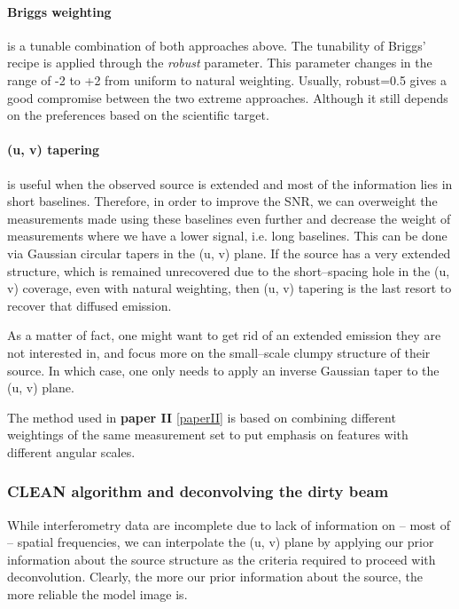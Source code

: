 \documentclass[paper=a4, fontsize=11pt]{scrartcl} %
\numberwithin{equation}{section} %
\numberwithin{figure}{section} %
\numberwithin{table}{section} %
\begin{document}
\paragraph*{Briggs weighting} is a tunable combination of both approaches above. The tunability of Briggs' recipe is applied through the \emph{robust} parameter. This parameter changes in the range of -2 to +2 from uniform to natural weighting. Usually, robust=0.5 gives a good compromise between the two extreme approaches. Although it still depends on the preferences based on the scientific target.

\paragraph*{(u, v) tapering} is useful when the observed source is extended and most of the information lies in short baselines. Therefore, in order to improve the SNR, we can overweight the measurements made using these baselines even further and decrease the weight of measurements where we have a lower signal, i.e. long baselines. This can be done via Gaussian circular tapers in the (u, v) plane. If the source has a very extended structure, which is remained unrecovered due to the short--spacing hole in the (u, v) coverage, even with natural weighting, then (u, v) tapering is the last resort to recover that diffused emission. 

As a matter of fact, one might want to get rid of an extended emission they are not interested in, and focus more on the small--scale clumpy structure of their source. In which case, one only needs to apply an inverse Gaussian taper to the (u, v) plane.

The method used in {\bf paper II} \ref{paperII} is based on combining different weightings of the same measurement set to put emphasis on features with different angular scales. 
\subsubsection*{CLEAN algorithm and deconvolving the dirty beam}
\label{sec:CLEAN}
While interferometry data are incomplete due to lack of information on -- most of -- spatial frequencies, we can interpolate the (u, v) plane by applying our prior information about the source structure as the criteria required to proceed with deconvolution. Clearly, the more our prior information about the source, the more reliable the model image is.
\end{document}
